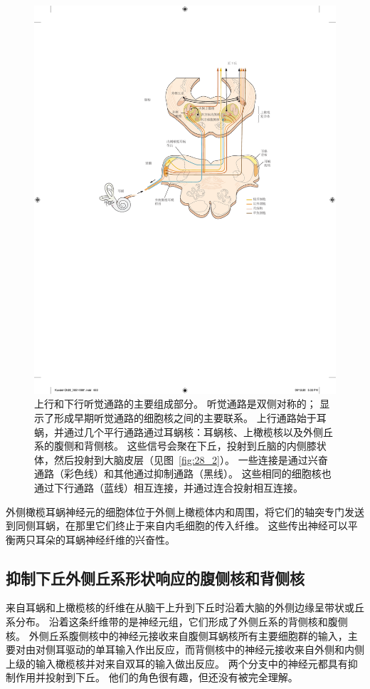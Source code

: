 \begin{figure}[htbp]
	\centering
	\includegraphics[width=0.85\linewidth]{chap28/fig_28_7}
	\caption{上行和下行听觉通路的主要组成部分。
		听觉通路是双侧对称的；
		显示了形成早期听觉通路的细胞核之间的主要联系。
		上行通路始于耳蜗，并通过几个平行通路通过耳蜗核：耳蜗核、上橄榄核以及外侧丘系的腹侧和背侧核。
		这些信号会聚在下丘，投射到丘脑的内侧膝状体，然后投射到大脑皮层（见图~\ref{fig:28_2}）。
		一些连接是通过兴奋通路（彩色线）和其他通过抑制通路（黑线）。 
		这些相同的细胞核也通过下行通路（蓝线）相互连接，并通过连合投射相互连接。}
	\label{fig:28_7}
\end{figure}


外侧橄榄耳蜗神经元的细胞体位于外侧上橄榄体内和周围，将它们的轴突专门发送到同侧耳蜗，在那里它们终止于来自内毛细胞的传入纤维。
这些传出神经可以平衡两只耳朵的耳蜗神经纤维的兴奋性\cite{darrow2006cochlear}。



\subsection{抑制下丘外侧丘系形状响应的腹侧核和背侧核}

来自耳蜗和上橄榄核的纤维在从脑干上升到下丘时沿着大脑的外侧边缘呈带状或丘系分布。
沿着这条纤维带的是神经元组，它们形成了外侧丘系的背侧核和腹侧核。
外侧丘系腹侧核中的神经元接收来自腹侧耳蜗核所有主要细胞群的输入，主要对由对侧耳驱动的单耳输入作出反应，而背侧核中的神经元接收来自外侧和内侧上级的输入橄榄核并对来自双耳的输入做出反应。
两个分支中的神经元都具有抑制作用并投射到下丘。
他们的角色很有趣，但还没有被完全理解。



